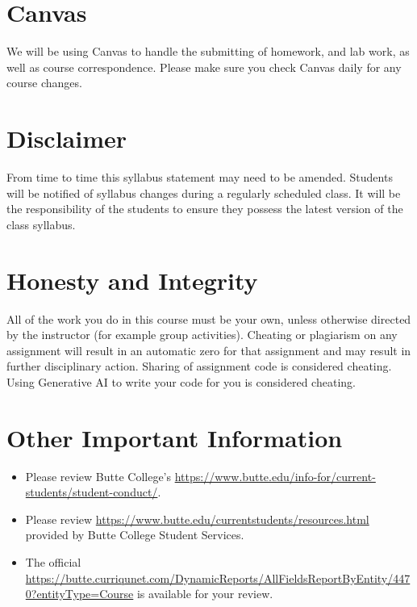 \documentclass[12pt]{article}
\begin{document}
	\section*{Canvas}
		We will be using Canvas to handle the submitting of homework, and lab work, as well as course correspondence. Please make sure you check Canvas daily for any course changes.
	
	\section*{Disclaimer}
		From time to time this syllabus statement may need to be amended. Students will be notified of syllabus changes during a regularly scheduled class. It will be the responsibility of the students to ensure they possess the latest version of the class syllabus.

	\section*{Honesty and Integrity}
		All of the work you do in this course must be your own, unless otherwise directed by the instructor (for example group activities). Cheating or plagiarism on any assignment will result in an automatic zero for that assignment and may result in further disciplinary action. Sharing of assignment code is considered cheating. Using Generative AI to write your code for you is considered cheating.

	\section*{Other Important Information}
		\begin{itemize}
			\item Please review Butte College's \href{Student Academic Policies and Procedures}{https://www.butte.edu/info-for/current-students/student-conduct/}.
			\item Please review \href{Campus Resources}{https://www.butte.edu/currentstudents/resources.html} provided by Butte College Student Services.
			\item The official \href{Course Outline of Record}{https://butte.curriqunet.com/DynamicReports/AllFieldsReportByEntity/4470?entityType=Course} is available for your review.
		\end{itemize}
	
\end{document}
